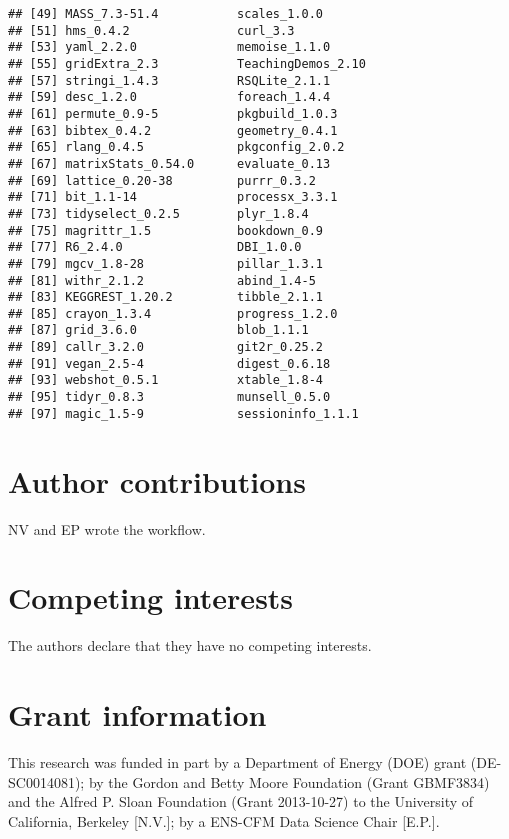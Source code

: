 \documentclass[9pt,a4paper,]{extarticle}
\begin{document}
\begin{verbatim}
## [49] MASS_7.3-51.4           scales_1.0.0           
## [51] hms_0.4.2               curl_3.3               
## [53] yaml_2.2.0              memoise_1.1.0          
## [55] gridExtra_2.3           TeachingDemos_2.10     
## [57] stringi_1.4.3           RSQLite_2.1.1          
## [59] desc_1.2.0              foreach_1.4.4          
## [61] permute_0.9-5           pkgbuild_1.0.3         
## [63] bibtex_0.4.2            geometry_0.4.1         
## [65] rlang_0.4.5             pkgconfig_2.0.2        
## [67] matrixStats_0.54.0      evaluate_0.13          
## [69] lattice_0.20-38         purrr_0.3.2            
## [71] bit_1.1-14              processx_3.3.1         
## [73] tidyselect_0.2.5        plyr_1.8.4             
## [75] magrittr_1.5            bookdown_0.9           
## [77] R6_2.4.0                DBI_1.0.0              
## [79] mgcv_1.8-28             pillar_1.3.1           
## [81] withr_2.1.2             abind_1.4-5            
## [83] KEGGREST_1.20.2         tibble_2.1.1           
## [85] crayon_1.3.4            progress_1.2.0         
## [87] grid_3.6.0              blob_1.1.1             
## [89] callr_3.2.0             git2r_0.25.2           
## [91] vegan_2.5-4             digest_0.6.18          
## [93] webshot_0.5.1           xtable_1.8-4           
## [95] tidyr_0.8.3             munsell_0.5.0          
## [97] magic_1.5-9             sessioninfo_1.1.1
\end{verbatim}

\hypertarget{author-contributions}{%
\section{Author contributions}\label{author-contributions}}

NV and EP wrote the workflow.

\hypertarget{competing-interests}{%
\section{Competing interests}\label{competing-interests}}

The authors declare that they have no competing interests.

\hypertarget{grant-information}{%
\section{Grant information}\label{grant-information}}

This research was funded in part by a Department of Energy (DOE) grant
(DE-SC0014081); by the Gordon and Betty Moore Foundation (Grant GBMF3834) and
the Alfred P. Sloan Foundation (Grant 2013-10-27) to the University of
California, Berkeley {[}N.V.{]}; by a ENS-CFM Data Science Chair {[}E.P.{]}.
\end{document}
